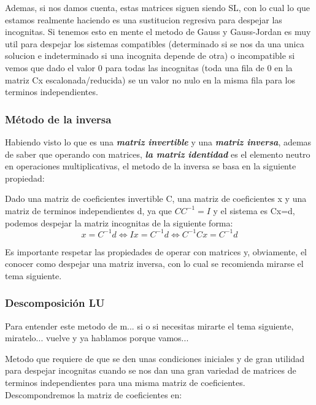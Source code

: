 \documentclass[11pt,a4paper]{article}
\begin{document}
Ademas, si nos damos cuenta, estas matrices siguen siendo SL, con lo cual lo que estamos realmente haciendo es una sustitucion regresiva para despejar las incognitas. Si tenemos esto en mente el metodo de Gauss y Gauss-Jordan es muy util para despejar los sistemas compatibles (determinado si se nos da una unica solucion e indeterminado si una incognita depende de otra) o incompatible si vemos que dado el valor 0 para todas las incognitas (toda una fila de 0 en la matriz Cx escalonada/reducida) se un valor no nulo en la misma fila para los terminos independientes.

\subsubsection{Método de la inversa}

Habiendo visto lo que es una \textbf{\textit{matriz invertible}} y una \textbf{\textit{matriz inversa}}, ademas de saber que operando con matrices, \textbf{\textit{la matriz identidad}} es el elemento neutro en operaciones multiplicativas, el metodo de la inversa se basa en la siguiente propiedad:

Dado una matriz de coeficientes invertible C, una matriz de coeficientes x y una matriz de terminos independientes d, ya que $CC^{-1}=I$ y el sistema es Cx=d, podemos despejar la matriz incognitas de la siguiente forma:$$x=C^{-1}d\Leftrightarrow Ix=C^{-1}d\Leftrightarrow C^{-1}Cx=C^{-1}d$$

Es importante respetar las propiedades de operar con matrices y, obviamente, el conocer como despejar una matriz inversa, con lo cual se recomienda mirarse el tema siguiente.

\subsubsection{Descomposición LU}

Para entender este metodo de m... si o si necesitas mirarte el tema siguiente, miratelo... vuelve y ya hablamos porque vamos...

Metodo que requiere de que se den unas condiciones iniciales y de gran utilidad para despejar incognitas cuando se nos dan una gran variedad de matrices de terminos independientes para una misma matriz de coeficientes. Descompondremos la matriz de coeficientes en:
\end{document}
